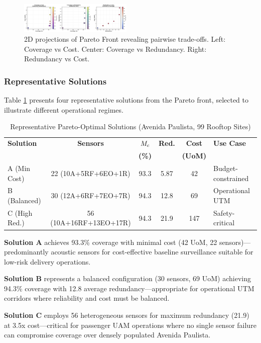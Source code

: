 \begin{figure}[t]
  \centering
  \includegraphics[width=0.48\textwidth]{figures/pareto_front_2d.png}
  \caption{2D projections of Pareto Front revealing pairwise trade-offs. Left: Coverage vs Cost. Center: Coverage vs Redundancy. Right: Redundancy vs Cost.}
  \label{fig:pareto2d}
\end{figure}

\subsubsection{Representative Solutions}

Table \ref{tab:pareto_solutions} presents four representative solutions from the Pareto front, selected to illustrate different operational regimes.

\begin{table}[h]
\centering
\caption{Representative Pareto-Optimal Solutions (Avenida Paulista, 99 Rooftop Sites)}
\label{tab:pareto_solutions}
\begin{tabular}{lccccp{3.5cm}}
\toprule
\textbf{Solution} & \textbf{Sensors} & $M_c$ & \textbf{Red.} & \textbf{Cost} & \textbf{Use Case} \\
 & & \textbf{(\%)} & & \textbf{(UoM)} & \\
\midrule
A (Min Cost) & 22 (10A+5RF+6EO+1R) & 93.3 & 5.87 & 42 & Budget-constrained \\
B (Balanced) & 30 (12A+6RF+7EO+7R) & 94.3 & 12.8 & 69 & Operational UTM \\
C (High Red.) & 56 (10A+16RF+13EO+17R) & 94.3 & 21.9 & 147 & Safety-critical \\
\bottomrule
\end{tabular}
\end{table}

\textbf{Solution A} achieves 93.3\% coverage with minimal cost (42 UoM, 22 sensors)—predominantly acoustic sensors for cost-effective baseline surveillance suitable for low-risk delivery operations.

\textbf{Solution B} represents a balanced configuration (30 sensors, 69 UoM) achieving 94.3\% coverage with 12.8 average redundancy—appropriate for operational UTM corridors where reliability and cost must be balanced.

\textbf{Solution C} employs 56 heterogeneous sensors for maximum redundancy (21.9) at 3.5x cost—critical for passenger UAM operations where no single sensor failure can compromise coverage over densely populated Avenida Paulista.

